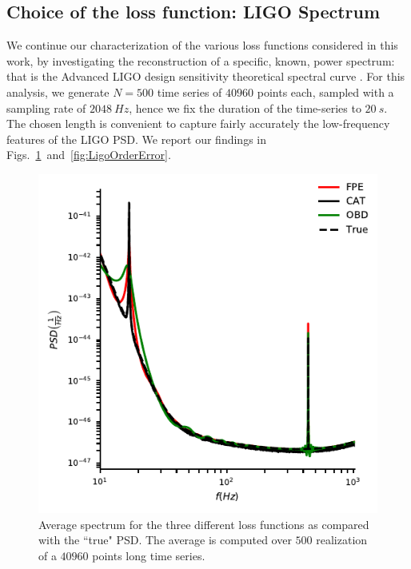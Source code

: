 \documentclass[twocolumn,showpacs,preprintnumbers,nofootinbib,prd,
superscriptaddress,10pt]{revtex4-1}
\begin{document}
\subsection{Choice of the loss function: LIGO Spectrum} \label{sec:LIGO_validation}
We continue our characterization of the various loss functions considered in this work, by investigating the 
reconstruction of a specific, known, power spectrum: that is the Advanced LIGO \cite{LIGO_2015, Virgo_2014, KAGRA_2012, KAGRA_2013} design sensitivity theoretical spectral curve \cite{LVK_future_2013, LIGO_PSDs}.
For this analysis, we generate $N = 500$ time series of $40960$ points each, sampled with a sampling rate of $\SI{2048}{Hz}$, hence we fix the duration
of the time-series to $\SI{20}{s}$. The chosen length is convenient to capture fairly accurately the low-frequency features of the LIGO PSD.
We report our findings in Figs.~\ref{fig:ligospectrum}~and~\ref{fig:LigoOrderError}.

\begin{figure}
    \centering
     \includegraphics[width = \linewidth]{Images/optimisers_comparison/ligo/compare_estimates.pdf}
      \caption{Average spectrum for the three different loss functions as compared with the ``true" PSD. The average is computed over $500$ realization of a $40960$ points long time series.}
       \label{fig:ligospectrum}
\end{figure}
\end{document}
